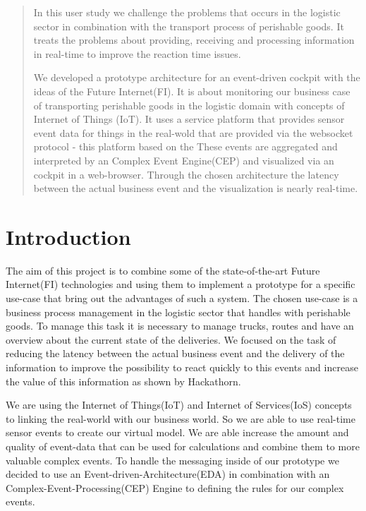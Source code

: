 \documentclass{acm_proc_article-sp}
\begin{document}
\maketitle
\begin{abstract}
In this user study we challenge the problems that occurs in the logistic sector in combination with the transport process of perishable goods.
It treats the problems about providing, receiving and processing information in real-time to improve the reaction time issues.

We developed a prototype architecture for an event-driven cockpit with the ideas of the Future Internet(FI). It is about monitoring our business case of transporting perishable goods in the logistic domain with concepts of Internet of Things (IoT). 
It uses a service platform that provides sensor event data for things in the real-wold that are provided via the websocket protocol - this platform based on the 
These events are aggregated and interpreted by an Complex Event Engine(CEP) and visualized via an cockpit in a web-browser.
Through the chosen architecture the latency between the actual business event and the visualization is nearly real-time.
\end{abstract}


\section{Introduction}
The aim of this project is to combine some of the state-of-the-art Future Internet(FI) technologies and using them to implement a prototype for a specific use-case that bring out the advantages of such a system.
The chosen use-case is a business process management in the logistic sector that handles with perishable goods. To manage this task it is necessary to manage trucks, routes and have an overview about the current state of the deliveries. We focused on the task of reducing the latency between the actual business event and the delivery of the information to improve the possibility to react quickly to this events and increase the value of this information as shown by Hackathorn\cite{hackathron:real_time_to_real_value}.

We are using the Internet of Things(IoT) and Internet of Services(IoS) concepts to linking the real-world with our business world. So we are able to use real-time sensor events to create our virtual model. We are able increase the amount and quality of event-data that can be used for calculations and combine them to more valuable complex events.
To handle the messaging inside of our prototype we decided to use an Event-driven-Architecture(EDA) in combination with an Complex-Event-Processing(CEP) Engine to defining the rules for our complex events.
\end{document}
